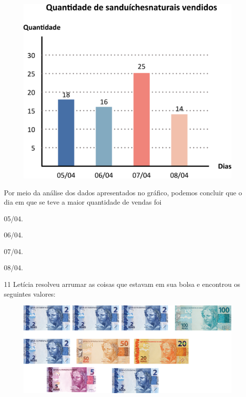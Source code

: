\begin{figure}[htpb!]
\centering
\includegraphics[width=\textwidth]{./media/image109.png}
\end{figure}

Por meio da análise dos dados apresentados no gráfico, podemos concluir que o dia em que se teve a maior quantidade de vendas foi

\begin{multicols}{2}
\begin{escolha}
\item
  05/04.
\item
  06/04.
\item
  07/04.
\item
  08/04.
\end{escolha}
\end{multicols}

\num{11} Letícia resolveu arrumar as coisas que estavam em sua bolsa e encontrou os seguintes valores:

\begin{figure}[htpb!]
\centering
\includegraphics[width=\textwidth]{./media/image110.png}
\end{figure}

